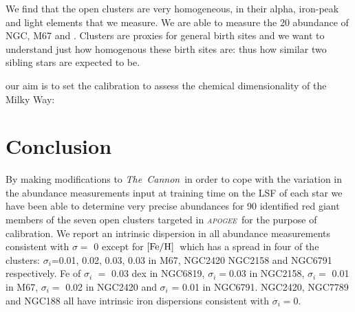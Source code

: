 \documentclass[14pt, preprint2]{aastex6}
\newcommand{\project}[1]{\textsl{#1}}
\newcommand{\tc}{\project{The~Cannon}}
\newcommand{\apogee}{\project{\textsc{apogee}}}
\newcommand{\feh}{\mbox{$\rm [Fe/H]$}}
\begin{document}
We find that the open clusters are very homogeneous, in their alpha, iron-peak and light elements that we measure. We are able to measure the 20 abundance of NGC, M67 and . Clusters are proxies for general birth sites and we want to understand just how homogenous these birth sites are: thus how similar two sibling stars are expected to be. 

 our aim is to set the calibration to assess the chemical dimensionality of the Milky Way:




\section{Conclusion}

By making modifications to \tc\ in order to cope with the variation in the abundance measurements input at training time on the LSF of each star we have been able to determine very precise abundances for 90 identified red giant members of the seven open clusters targeted in \apogee\ for the purpose of calibration. We report an intrinsic dispersion in all abundance measurements consistent with $\sigma=$ 0 except for \feh\ which has a spread in four of the clusters: $\sigma_i$=0.01, 0.02,  0.03, 0.03 in M67, NGC2420 NGC2158 and NGC6791 respectively. 
Fe of $\sigma_i$ $=$ 0.03 dex in NGC6819, $\sigma_i$$=$0.03 in NGC2158, $\sigma_i$$=$ 0.01 in M67,  $\sigma_i$$=$ 0.02 in NGC2420 and $\sigma_i$ = 0.01 in NGC6791. NGC2420, NGC7789 and NGC188 all have intrinsic iron dispersions consistent with  $\sigma_i$$=$0. 

\pagebreak
\end{document}
